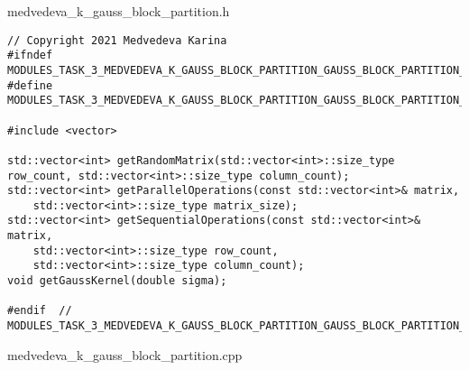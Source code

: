 \documentclass{report}
\begin{document}
medvedeva\_k\_gauss\_block\_partition.h
\begin{lstlisting}
// Copyright 2021 Medvedeva Karina
#ifndef MODULES_TASK_3_MEDVEDEVA_K_GAUSS_BLOCK_PARTITION_GAUSS_BLOCK_PARTITION_H_
#define MODULES_TASK_3_MEDVEDEVA_K_GAUSS_BLOCK_PARTITION_GAUSS_BLOCK_PARTITION_H_

#include <vector>

std::vector<int> getRandomMatrix(std::vector<int>::size_type row_count, std::vector<int>::size_type column_count);
std::vector<int> getParallelOperations(const std::vector<int>& matrix,
    std::vector<int>::size_type matrix_size);
std::vector<int> getSequentialOperations(const std::vector<int>& matrix,
    std::vector<int>::size_type row_count,
    std::vector<int>::size_type column_count);
void getGaussKernel(double sigma);

#endif  // MODULES_TASK_3_MEDVEDEVA_K_GAUSS_BLOCK_PARTITION_GAUSS_BLOCK_PARTITION_H_

\end{lstlisting}
medvedeva\_k\_gauss\_block\_partition.cpp
\end{document}
